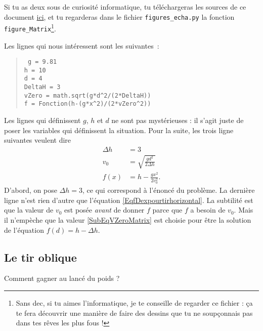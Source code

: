 Si tu as deux sous de curiosité informatique, tu téléchargeras les sources de ce document \href{http://student.ulb.ac.be/~lclaesse/physique-math.tar.gz}{ici}, et tu regarderas dans le fichier \texttt{figures\_echa.py} la fonction \texttt{figure\_Matrix}\footnote{Sans dec, si tu aimes l'informatique, je te conseille de regarder ce fichier : ça te fera découvrir une manière de faire des dessins que tu ne soupçonnais pas dans tes rêves les plus fous !}.

Les lignes qui nous intéressent sont les suivantes~:
\begin{quote}
	\texttt{ 
	g = 9.81					\\
	h = 10						\\
	d = 4						\\
	DeltaH = 3					\\
	vZero = math.sqrt(g*d\textasciicircum 2/(2*DeltaH))		\\
	f = Fonction(h-(g*x\textasciicircum 2)/(2*vZero\textasciicircum 2))		
	}
\end{quote}
Les lignes qui définissent $g$, $h$ et $d$ ne sont pas mystérieuses : il s'agit juste de poser les variables qui définissent la situation. Pour la suite, les trois ligne suivantes veulent dire
\begin{subequations}
	\begin{align}
		\Delta h&=3\\
		v_0&=\sqrt{ \frac{ gd^2 }{ 2\Delta h } }	\label{SubEqVZeroMatrix}\\
		f(x)&=h-\frac{ gx^2 }{ 2v_0^2 }.
	\end{align}
\end{subequations}
D'abord, on pose $\Delta h=3$, ce qui correspond à l'énoncé du problème. La dernière ligne n'est rien d'autre que l'équation \eqref{EqfDexpourtirhorizontal}. La subtilité est que la valeur de $v_0$ est posée \emph{avant} de donner $f$ parce que $f$ a besoin de $v_0$. Mais il n'empèche que la valeur \eqref{SubEqVZeroMatrix} est choisie pour être la solution de l'équation $f(d)=h-\Delta h$.


\subsection{Le tir oblique}

\begin{pourquoidonc}
	Comment gagner au lancé du poids ?
\end{pourquoidonc}

